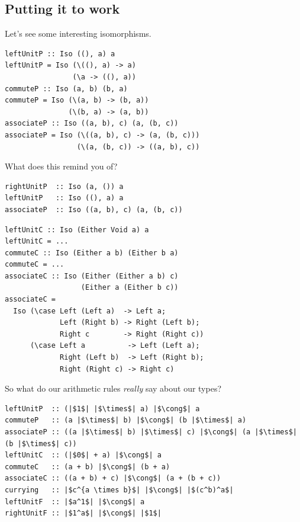\documentclass[tikz]{beamer}
\theoremstyle{definition}
\begin{document}
\subsection{Putting it to work}
\begin{frame}[fragile]
Let's see some interesting isomorphisms.

\begin{verbatim}
leftUnitP :: Iso ((), a) a
leftUnitP = Iso (\((), a) -> a)
                (\a -> ((), a))
commuteP :: Iso (a, b) (b, a)
commuteP = Iso (\(a, b) -> (b, a))
               (\(b, a) -> (a, b))
associateP :: Iso ((a, b), c) (a, (b, c))
associateP = Iso (\((a, b), c) -> (a, (b, c)))
                 (\(a, (b, c)) -> ((a, b), c))
\end{verbatim}
\end{frame}
\begin{frame}[fragile]
What does this remind you of?
\begin{verbatim}
rightUnitP  :: Iso (a, ()) a
leftUnitP   :: Iso ((), a) a
associateP  :: Iso ((a, b), c) (a, (b, c))
\end{verbatim}
\end{frame}
\begin{frame}[fragile]
\begin{verbatim}
leftUnitC :: Iso (Either Void a) a
leftUnitC = ...
commuteC :: Iso (Either a b) (Either b a)
commuteC = ...
associateC :: Iso (Either (Either a b) c)
                  (Either a (Either b c))
associateC =
  Iso (\case Left (Left a)  -> Left a;
             Left (Right b) -> Right (Left b);
             Right c        -> Right (Right c))
      (\case Left a          -> Left (Left a);
             Right (Left b)  -> Left (Right b);
             Right (Right c) -> Right c)
\end{verbatim}
\end{frame}

\frame
{ 
	So what do our arithmetic rules \textit{really} say about our types?
}

\begin{frame}[fragile]
\begin{verbatim}
leftUnitP  :: (|$1$| |$\times$| a) |$\cong$| a
commuteP   :: (a |$\times$| b) |$\cong$| (b |$\times$| a)
associateP :: ((a |$\times$| b) |$\times$| c) |$\cong$| (a |$\times$| (b |$\times$| c))
leftUnitC  :: (|$0$| + a) |$\cong$| a
commuteC   :: (a + b) |$\cong$| (b + a)
associateC :: ((a + b) + c) |$\cong$| (a + (b + c))
currying   :: |$c^{a \times b}$| |$\cong$| |$(c^b)^a$|
leftUnitF  :: |$a^1$| |$\cong$| a
rightUnitF :: |$1^a$| |$\cong$| |$1$|
\end{verbatim}
\end{frame}
\end{document}
